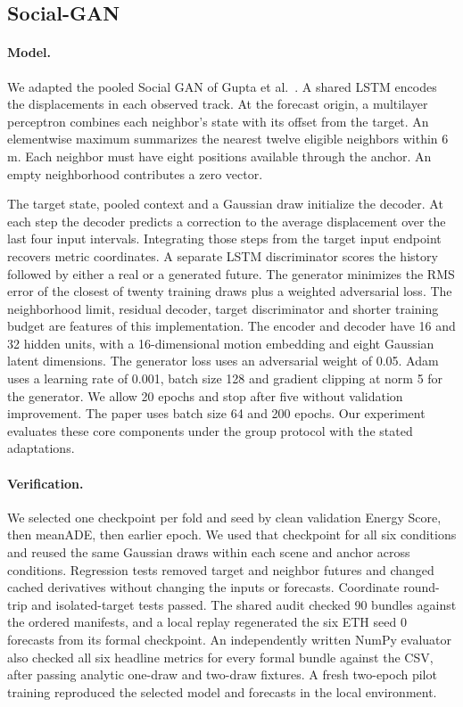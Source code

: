 \subsection{Social-GAN}
\label{sec:social_gan}


\paragraph{Model.}
We adapted the pooled Social GAN of Gupta et al.\ \cite{gupta2018socialgan}.
A shared LSTM encodes the displacements in each observed track. At the
forecast origin, a multilayer perceptron combines each neighbor's state
with its offset from the target. An elementwise maximum summarizes the
nearest twelve eligible neighbors within 6\,m. Each neighbor must have
eight positions available through the anchor. An empty neighborhood
contributes a zero vector.

The target state, pooled context and a Gaussian draw initialize the
decoder. At each step the decoder predicts a correction to the average
displacement over the last four input intervals. Integrating those
steps from the target input endpoint recovers metric coordinates.
A separate LSTM discriminator scores the history followed by either
a real or a generated future. The generator minimizes the RMS error
of the closest of twenty training draws plus a weighted adversarial
loss. The neighborhood limit, residual decoder, target discriminator
and shorter training budget are features of this implementation.
The encoder and decoder have 16 and 32 hidden units, with a 16-dimensional
motion embedding and eight Gaussian latent dimensions. The generator loss
uses an adversarial weight of 0.05. Adam uses a learning rate of 0.001,
batch size 128 and gradient clipping at norm 5 for the generator.
We allow 20 epochs and stop after five without validation improvement.
The paper uses batch size 64 and 200 epochs. Our experiment evaluates
these core components under the group protocol with the stated adaptations.

\paragraph{Verification.}
We selected one checkpoint per fold and seed by clean validation Energy
Score, then meanADE, then earlier epoch. We used that checkpoint for all
six conditions and reused the same Gaussian draws within each scene and
anchor across conditions. Regression tests removed target and neighbor
futures and changed cached derivatives without changing the inputs or
forecasts. Coordinate round-trip and isolated-target tests passed. The
shared audit checked 90 bundles against the ordered manifests, and a
local replay regenerated the six ETH seed 0 forecasts from its formal
checkpoint. An independently written NumPy evaluator also checked
all six headline metrics for every formal bundle against the CSV, after
passing analytic one-draw and two-draw fixtures. A fresh two-epoch pilot
training reproduced the selected model and forecasts in the local environment.


